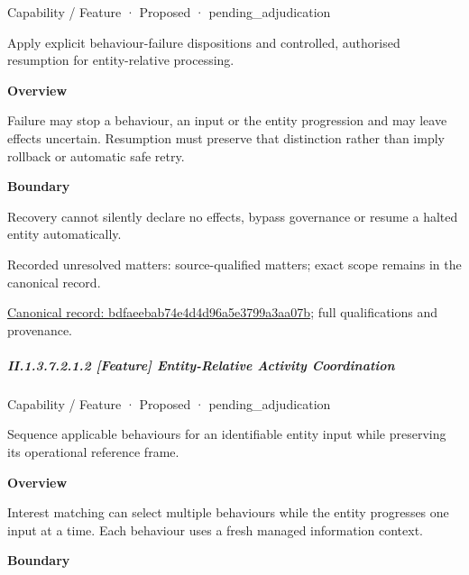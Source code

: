 \label{element:bdfaeebab74e4d4d96a5e3799a3aa07b}
{\small Capability / Feature · Proposed · pending\_adjudication}\par

Apply explicit behaviour-failure dispositions and controlled, authorised resumption for entity-relative processing.



\textbf{Overview}



Failure may stop a behaviour, an input or the entity progression and may leave effects uncertain. Resumption must preserve that distinction rather than imply rollback or automatic safe retry.



\textbf{Boundary}



Recovery cannot silently declare no effects, bypass governance or resume a halted entity automatically.


{\small Recorded unresolved matters: source-qualified matters; exact scope remains in the canonical record.}\par
{\footnotesize \href{../../../../continuum/strategy/capability/feature/bdfaeebab74e4d4d96a5e3799a3aa07b.md}{Canonical record: bdfaeebab74e4d4d96a5e3799a3aa07b}; full qualifications and provenance.}\par
\subparagraph*{II.1.3.7.2.1.2 [Feature] Entity-Relative Activity Coordination}
\label{navigation:II.1.3.7.2.1.2}

\label{element:b9960d7de097464ea6de94929ca48c89}
{\small Capability / Feature · Proposed · pending\_adjudication}\par

Sequence applicable behaviours for an identifiable entity input while preserving its operational reference frame.



\textbf{Overview}



Interest matching can select multiple behaviours while the entity progresses one input at a time. Each behaviour uses a fresh managed information context.



\textbf{Boundary}



